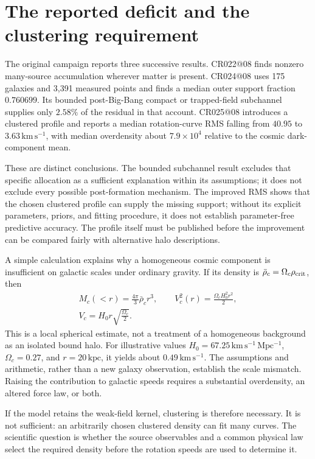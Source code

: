 \section{The reported deficit and the clustering requirement}

The original campaign reports three successive results. CR022@08 finds nonzero many-source accumulation wherever matter is present. CR024@08 uses 175 galaxies and 3,391 measured points and finds a median outer support fraction $0.760699$. Its bounded post-Big-Bang compact or trapped-field subchannel supplies only $2.58\%$ of the residual in that account. CR025@08 introduces a clustered profile and reports a median rotation-curve RMS falling from $40.95$ to $3.63\,\mathrm{km\,s^{-1}}$, with median overdensity about $7.9\times10^4$ relative to the cosmic dark-component mean.

These are distinct conclusions. The bounded subchannel result excludes that specific allocation as a sufficient explanation within its assumptions; it does not exclude every possible post-formation mechanism. The improved RMS shows that the chosen clustered profile can supply the missing support; without its explicit parameters, priors, and fitting procedure, it does not establish parameter-free predictive accuracy. The profile itself must be published before the improvement can be compared fairly with alternative halo descriptions.

A simple calculation explains why a homogeneous cosmic component is insufficient on galactic scales under ordinary gravity. If its density is $\bar\rho_c=\Omega_c\rho_{\rm crit}$, then
\begin{equation}
 \begin{gathered}
 M_c(<r)=\frac{4\pi}{3}\bar\rho_c r^3,\qquad V_c^2(r)=\frac{\Omega_cH_0^2r^2}{2},\\
 V_c=H_0r\sqrt{\frac{\Omega_c}{2}}.
 \end{gathered}
 \label{c10:uniform}
\end{equation}
This is a local spherical estimate, not a treatment of a homogeneous background as an isolated bound halo. For illustrative values $H_0=67.25\,\mathrm{km\,s^{-1}\,Mpc^{-1}}$, $\Omega_c=0.27$, and $r=20\,\mathrm{kpc}$, it yields about $0.49\,\mathrm{km\,s^{-1}}$. The assumptions and arithmetic, rather than a new galaxy observation, establish the scale mismatch. Raising the contribution to galactic speeds requires a substantial overdensity, an altered force law, or both.

If the model retains the weak-field kernel, clustering is therefore necessary. It is not sufficient: an arbitrarily chosen clustered density can fit many curves. The scientific question is whether the source observables and a common physical law select the required density before the rotation speeds are used to determine it.

